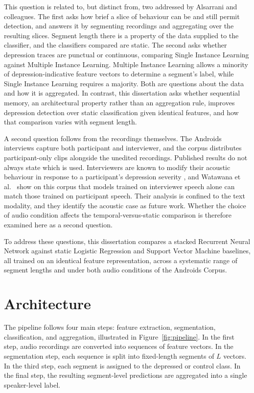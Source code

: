 \documentclass{mproj}
\begin{document}
This question is related to, but distinct from, two addressed by Alsarrani and colleagues. The first \cite{alsarrani2022thin} asks how brief a slice of behaviour can be and still permit detection, and answers it by segmenting recordings and aggregating over the resulting slices. Segment length there is a property of the data supplied to the classifier, and the classifiers compared are static. The second \cite{alsarrani2025} asks whether depression traces are punctual or continuous, comparing Single Instance Learning against Multiple Instance Learning. Multiple Instance Learning allows a minority of depression-indicative feature vectors to determine a segment's label, while Single Instance Learning requires a majority. Both are questions about the data and how it is aggregated. In contrast, this dissertation asks whether sequential memory, an architectural property rather than an aggregation rule, improves depression detection over static classification given identical features, and how that comparison varies with segment length.

A second question follows from the recordings themselves. The Androids interviews capture both participant and interviewer, and the corpus distributes participant-only clips alongside the unedited recordings. Published results do not always state which is used. Interviewers are known to modify their acoustic behaviour in response to a participant's depression severity \cite{scherer2014dyadic}, and Watawana et al.\ \cite{watawana2026} show on this corpus that models trained on interviewer speech alone can match those trained on participant speech. Their analysis is confined to the text modality, and they identify the acoustic case as future work. Whether the choice of audio condition affects the temporal-versus-static comparison is therefore examined here as a second question.

To address these questions, this dissertation compares a stacked Recurrent Neural Network against static Logistic Regression and Support Vector Machine baselines, all trained on an identical feature representation, across a systematic range of segment lengths and under both audio conditions of the Androids Corpus.

\chapter{Architecture}\label{architecture}

The pipeline follows four main steps: feature extraction, segmentation, classification, and aggregation, illustrated in Figure~\ref{fig:pipeline}. In the first step, audio recordings are converted into sequences of feature vectors. In the segmentation step, each sequence is split into fixed-length segments of $L$ vectors. In the third step, each segment is assigned to the depressed or control class. In the final step, the resulting segment-level predictions are aggregated into a single speaker-level label.
\end{document}
